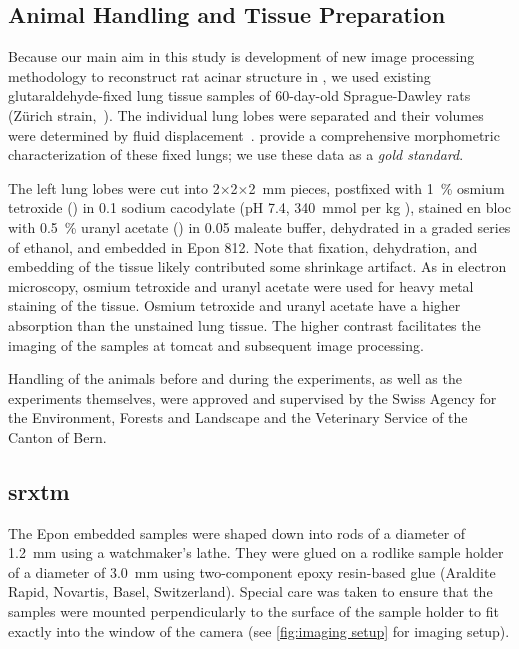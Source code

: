 \subsection[Animal Handling]{Animal Handling and Tissue Preparation}
Because our main aim in this study is development of new image processing methodology to reconstruct rat acinar structure in \threed, we used existing glutaraldehyde-fixed lung tissue samples of 60-day-old Sprague-Dawley rats (Zürich strain,~\cite{Tschanz2003}). The individual lung lobes were separated and their volumes were determined by fluid displacement~\cite{Scherle1970}. \citet{Tschanz2003} provide a comprehensive morphometric characterization of these fixed lungs; we use these data as a \emph{gold standard}.

The left lung lobes were cut into 2$\times$2$\times$\SI{2}{\milli\meter} pieces, postfixed with \SI{1}{\percent} osmium tetroxide () in \SI{0.1}{\Molar} sodium cacodylate (pH 7.4, \SI{340}{\mmol} per \si{\kilogram} ), stained en bloc with \SI{0.5}{\percent} uranyl acetate () in \SI{0.05}{\Molar} maleate buffer, dehydrated in a graded series of ethanol, and embedded in Epon 812. Note that fixation, dehydration, and embedding of the tissue likely contributed some shrinkage artifact. As in electron microscopy, osmium tetroxide and uranyl acetate were used for heavy metal staining of the tissue. Osmium tetroxide and uranyl acetate have a higher absorption than the unstained lung tissue. The higher contrast facilitates the imaging of the samples at \ac{tomcat} and subsequent image processing.

Handling of the animals before and during the experiments, as well as the experiments themselves, were approved and supervised by the Swiss Agency for the Environment, Forests and Landscape and the Veterinary Service of the Canton of Bern.

\subsection{\acs{srxtm}}
The Epon embedded samples were shaped down into rods of a diameter of \SI{1.2}{\milli\meter} using a watchmaker's lathe. They were glued on a rodlike sample holder of a diameter of \SI{3.0}{\milli\meter} using two-component epoxy resin-based glue (Araldite Rapid, Novartis, Basel, Switzerland). Special care was taken to ensure that the samples were mounted perpendicularly to the surface of the sample holder to fit exactly into the window of the camera (see \autoref{fig:imaging setup} for imaging setup).


